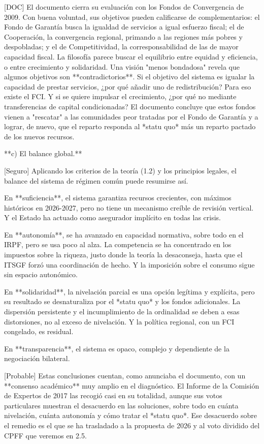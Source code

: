 \documentclass[10pt,a4paper]{article}
\begin{document}
[DOC] El documento cierra su evaluación con los Fondos de Convergencia de 2009. Con buena voluntad, sus objetivos pueden calificarse de complementarios: el Fondo de Garantía busca la igualdad de servicios a igual esfuerzo fiscal; el de Cooperación, la convergencia regional, primando a las regiones más pobres y despobladas; y el de Competitividad, la corresponsabilidad de las de mayor capacidad fiscal. La filosofía parece buscar el equilibrio entre equidad y eficiencia, o entre crecimiento y solidaridad. Una visión "menos bondadosa" revela que algunos objetivos son **contradictorios**. Si el objetivo del sistema es igualar la capacidad de prestar servicios, ¿por qué añadir uno de redistribución? Para eso existe el FCI. Y si se quiere impulsar el crecimiento, ¿por qué no mediante transferencias de capital condicionadas? El documento concluye que estos fondos vienen a "rescatar" a las comunidades peor tratadas por el Fondo de Garantía y a lograr, de nuevo, que el reparto responda al *statu quo* más un reparto pactado de los nuevos recursos.

**c) El balance global.**

[Seguro] Aplicando los criterios de la teoría (1.2) y los principios legales, el balance del sistema de régimen común puede resumirse así.

En **suficiencia**, el sistema garantiza recursos crecientes, con máximos históricos en 2026-2027, pero no tiene un mecanismo creíble de revisión vertical. Y el Estado ha actuado como asegurador implícito en todas las crisis.

En **autonomía**, se ha avanzado en capacidad normativa, sobre todo en el IRPF, pero se usa poco al alza. La competencia se ha concentrado en los impuestos sobre la riqueza, justo donde la teoría la desaconseja, hasta que el ITSGF forzó una coordinación de hecho. Y la imposición sobre el consumo sigue sin espacio autonómico.

En **solidaridad**, la nivelación parcial es una opción legítima y explícita, pero su resultado se desnaturaliza por el *statu quo* y los fondos adicionales. La dispersión persistente y el incumplimiento de la ordinalidad se deben a esas distorsiones, no al exceso de nivelación. Y la política regional, con un FCI congelado, es residual.

En **transparencia**, el sistema es opaco, complejo y dependiente de la negociación bilateral.

[Probable] Estas conclusiones cuentan, como anunciaba el documento, con un **consenso académico** muy amplio en el diagnóstico. El Informe de la Comisión de Expertos de 2017 las recogió casi en su totalidad, aunque sus votos particulares muestran el desacuerdo en las soluciones, sobre todo en cuánta nivelación, cuánta autonomía y cómo tratar el *statu quo*. Ese desacuerdo sobre el remedio es el que se ha trasladado a la propuesta de 2026 y al voto dividido del CPFF que veremos en 2.5.
\end{document}
